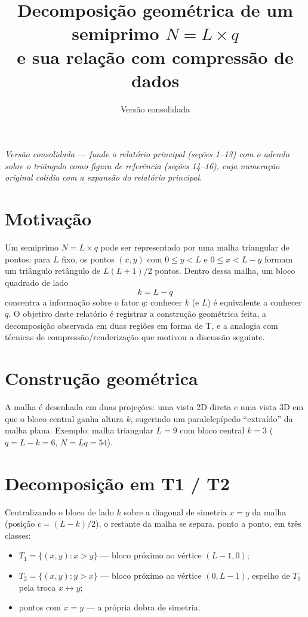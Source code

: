 \documentclass[11pt,a4paper]{article}
\title{Decomposição geométrica de um semiprimo $N = L \times q$\\
\large e sua relação com compressão de dados}
\author{}
\date{Versão consolidada}
\begin{document}
\maketitle

\noindent\textit{Versão consolidada — funde o relatório principal (seções 1--13) com o adendo sobre o triângulo como figura de referência (seções 14--16), cuja numeração original colidia com a expansão do relatório principal.}

\tableofcontents
\newpage

\section{Motivação}

Um semiprimo $N = L \times q$ pode ser representado por uma malha triangular de pontos: para $L$ fixo, os pontos $(x, y)$ com $0 \le y < L$ e $0 \le x < L - y$ formam um triângulo retângulo de $L(L+1)/2$ pontos. Dentro dessa malha, um bloco quadrado de lado
\[
k = L - q
\]
concentra a informação sobre o fator $q$: conhecer $k$ (e $L$) é equivalente a conhecer $q$. O objetivo deste relatório é registrar a construção geométrica feita, a decomposição observada em duas regiões em forma de T, e a analogia com técnicas de compressão/renderização que motivou a discussão seguinte.

\section{Construção geométrica}

A malha é desenhada em duas projeções: uma vista 2D direta e uma vista 3D em que o bloco central ganha altura $k$, sugerindo um paralelepípedo ``extraído'' da malha plana. Exemplo: malha triangular $L=9$ com bloco central $k=3$ ($q = L-k = 6$, $N = Lq = 54$).

\section{Decomposição em T1 / T2}

Centralizando o bloco de lado $k$ sobre a diagonal de simetria $x=y$ da malha (posição $c = (L-k)/2$), o restante da malha se separa, ponto a ponto, em três classes:

\begin{itemize}
  \item $T_1 = \{(x,y): x > y\}$ --- bloco próximo ao vértice $(L-1, 0)$;
  \item $T_2 = \{(x,y): y > x\}$ --- bloco próximo ao vértice $(0, L-1)$, espelho de $T_1$ pela troca $x \leftrightarrow y$;
  \item pontos com $x=y$ --- a própria dobra de simetria.
\end{itemize}
\end{document}
